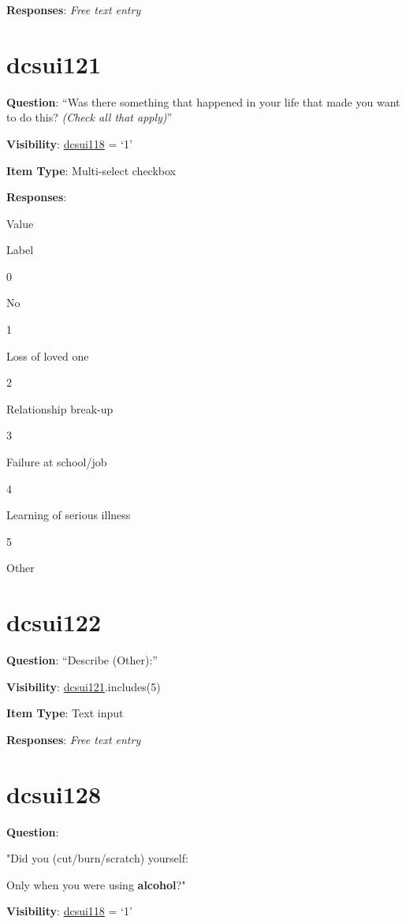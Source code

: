 \documentclass[]{book}
\begin{document}
\textbf{Responses}: \emph{Free text entry}

\hypertarget{dcsui121}{%
\section{dcsui121}\label{dcsui121}}

\textbf{Question}: ``Was there something that happened in your life that made you want to do this? \emph{(Check all that apply)}''

\textbf{Visibility}: \protect\hyperlink{dcsui118}{dcsui118} = `1'

\textbf{Item Type}: Multi-select checkbox

\textbf{Responses}:

Value

Label

0

No

1

Loss of loved one

2

Relationship break-up

3

Failure at school/job

4

Learning of serious illness

5

Other

\hypertarget{dcsui122}{%
\section{dcsui122}\label{dcsui122}}

\textbf{Question}: ``Describe (Other):''

\textbf{Visibility}: \protect\hyperlink{dcsui121}{dcsui121}.includes(5)

\textbf{Item Type}: Text input

\textbf{Responses}: \emph{Free text entry}

\hypertarget{dcsui128}{%
\section{dcsui128}\label{dcsui128}}

\textbf{Question}:

"Did you (cut/burn/scratch) yourself:

Only when you were using \textbf{alcohol}?"

\textbf{Visibility}: \protect\hyperlink{dcsui118}{dcsui118} = `1'
\end{document}

